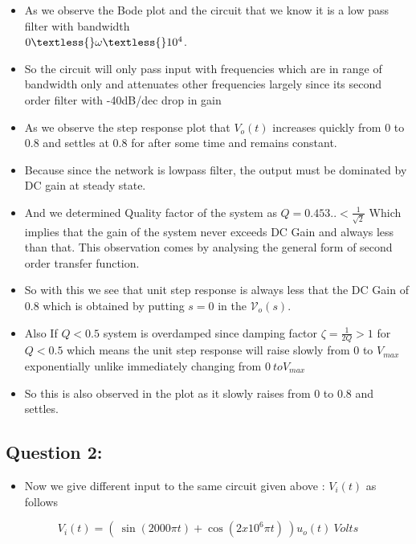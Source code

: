 \documentclass[11pt, a4paper]{article}
\begin{document}
\begin{itemize}

\item
  As we observe the Bode plot and the circuit that we know it is a low pass
  filter with bandwidth \\ $ 0 \textless{} \omega \textless{} 10^{4}$.
\item
  So the circuit will only pass input with frequencies which are in
  range of bandwidth only and attenuates other frequencies largely since
  its second order filter with -40dB/dec drop in gain
  \item
  As we observe the step response plot that \(V_{o}(t)\) increases quickly from 0 to
  0.8 and settles at 0.8 for after some time and remains constant.
\item
  Because since the network is lowpass filter, the output must be
  dominated by DC gain at steady state.
\item
  And we determined Quality factor of the system as
  \(Q = 0.453.. < \frac{1}{\sqrt{2}}\) Which implies that the gain of
  the system never exceeds DC Gain and always less than that. This
  observation comes by analysing the general form of second order
  transfer function.
\item
  So with this we see that unit step response is always less that the DC
  Gain of \(0.8\) which is obtained by putting \(s=0\) in the
  \(\mathcal{V}_{o}(s)\).
\item
  Also If \(Q < 0.5\) system is overdamped since damping factor
  \(\zeta = \frac{1}{2Q} > 1\) for \(Q<0.5\) which means the unit step
  response will raise slowly from 0 to \(V_{max}\) exponentially unlike
  immediately changing from \(0 \ to V_{max}\)
\item
  So this is also observed in the plot as it slowly raises from 0 to 0.8
  and settles.

\end{itemize}
  \newpage
  \subsection{Question 2:}\label{question-2}

  \begin{itemize}
  \item
    Now we give different input to the same circuit given above :
    \(V_{i}(t)\) as follows
  \end{itemize}
  
  \begin{equation}
  V_{i}(t) = ( \ \sin(2000\pi t) + \cos(2x10^{6}\pi t) \ )u_{o}(t) \ Volts
  \end{equation}
  
\end{document}
